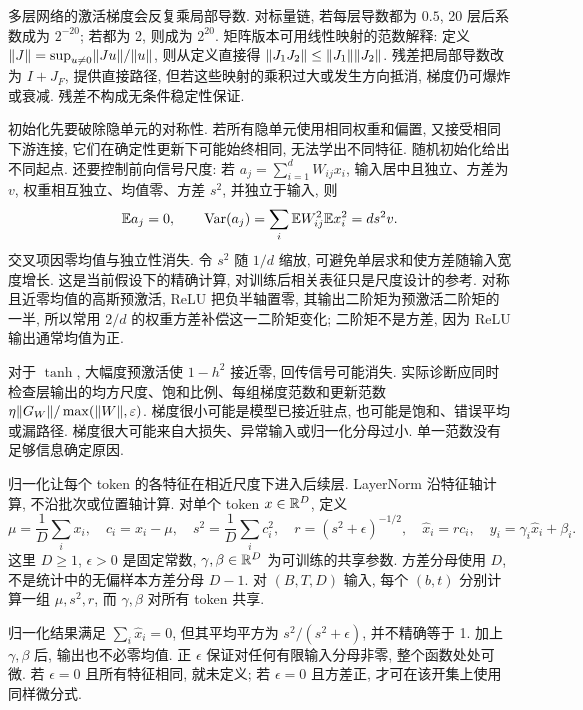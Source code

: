 多层网络的激活梯度会反复乘局部导数. 对标量链, 若每层导数都为 $0.5$, 20 层后系数成为 $2^{-20}$; 若都为 2, 则成为 $2^{20}$. 矩阵版本可用线性映射的范数解释: 定义 $\lVert J\rVert=\sup_{u\ne0}\lVert Ju\rVert/\lVert u\rVert$, 则从定义直接得 $\lVert J_1J_2\rVert\le\lVert J_1\rVert\lVert J_2\rVert$. 残差把局部导数改为 $I+J_F$, 提供直接路径, 但若这些映射的乘积过大或发生方向抵消, 梯度仍可爆炸或衰减. 残差不构成无条件稳定性保证.

初始化先要破除隐单元的对称性. 若所有隐单元使用相同权重和偏置, 又接受相同下游连接, 它们在确定性更新下可能始终相同, 无法学出不同特征. 随机初始化给出不同起点. 还要控制前向信号尺度: 若 $a_j=\sum_{i=1}^dW_{ij}x_i$, 输入居中且独立、方差为 $v$, 权重相互独立、均值零、方差 $s^2$, 并独立于输入, 则
\[
\mathbb E a_j=0,\qquad \operatorname{Var}(a_j)=\sum_i\mathbb E W_{ij}^2\mathbb E x_i^2=ds^2v.
\]
交叉项因零均值与独立性消失. 令 $s^2$ 随 $1/d$ 缩放, 可避免单层求和使方差随输入宽度增长. 这是当前假设下的精确计算, 对训练后相关表征只是尺度设计的参考. 对称且近零均值的高斯预激活, ReLU 把负半轴置零, 其输出二阶矩为预激活二阶矩的一半, 所以常用 $2/d$ 的权重方差补偿这一二阶矩变化; 二阶矩不是方差, 因为 ReLU 输出通常均值为正.

对于 $\tanh$, 大幅度预激活使 $1-h^2$ 接近零, 回传信号可能消失. 实际诊断应同时检查层输出的均方尺度、饱和比例、每组梯度范数和更新范数 $\eta\lVert G_W\rVert/\max(\lVert W\rVert,\varepsilon)$. 梯度很小可能是模型已接近驻点, 也可能是饱和、错误平均或漏路径. 梯度很大可能来自大损失、异常输入或归一化分母过小. 单一范数没有足够信息确定原因.

\label{sec:layernorm}
归一化让每个 token 的各特征在相近尺度下进入后续层. LayerNorm 沿特征轴计算, 不沿批次或位置轴计算\cite{layernorm}. 对单个 token $x\in\mathbb R^D$, 定义
\[
\mu=\frac1D\sum_i x_i,\quad c_i=x_i-\mu,\quad
s^2=\frac1D\sum_i c_i^2,\quad r=(s^2+\epsilon)^{-1/2},\quad
\widehat x_i=rc_i,\quad y_i=\gamma_i\widehat x_i+\beta_i.
\]
这里 $D\ge1$, $\epsilon>0$ 是固定常数, $\gamma,\beta\in\mathbb R^D$ 为可训练的共享参数. 方差分母使用 $D$, 不是统计中的无偏样本方差分母 $D-1$. 对 $(B,T,D)$ 输入, 每个 $(b,t)$ 分别计算一组 $\mu,s^2,r$, 而 $\gamma,\beta$ 对所有 token 共享.

归一化结果满足 $\sum_i\widehat x_i=0$, 但其平均平方为 $s^2/(s^2+\epsilon)$, 并不精确等于 1. 加上 $\gamma,\beta$ 后, 输出也不必零均值. 正 $\epsilon$ 保证对任何有限输入分母非零, 整个函数处处可微. 若 $\epsilon=0$ 且所有特征相同, 就未定义; 若 $\epsilon=0$ 且方差正, 才可在该开集上使用同样微分式.

